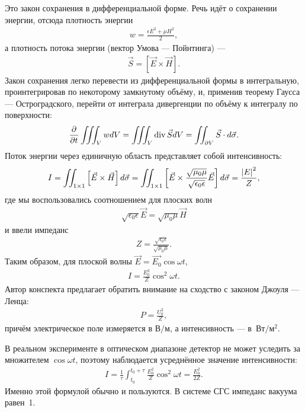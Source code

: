 Это закон сохранения в дифференциальной форме. Речь идёт о сохранении энергии,
отсюда плотность энергии
\begin{align*}
  w = 
  \frac{\epsilon E^2 + \mu H^2}{2},
\end{align*}
а плотность потока энергии (вектор Умова --- Пойнтинга) ---
\begin{align*}
  \vec{S} = \left[\vec{E} \times \vec{H}\right].
\end{align*}
Закон сохранения легко перевести из дифференциальной формы в интегральную,
проинтегрировав по некоторому замкнутому объёму, и, применив теорему Гаусса ---
Остроградского, перейти от интеграла дивергенции по объёму к интегралу по
поверхности:
\begin{align*}
  \frac{\partial^{} }{\partial t^{}}\iiint_{V} w dV = 
  \iiint_{V} \operatorname*{div}\vec{S} dV = 
  \iint_{\partial V} \vec{S} \cdot d\vec{\sigma}.
\end{align*}
Поток энергии через единичную область представляет собой интенсивность:
\begin{align*}
  I = 
  \iint_{1\times 1} \left[\vec{E} \times \vec{H}\right] d\vec{\sigma} = 
  \iint_{1\times 1} \left[\vec{E} \times
  \frac{\sqrt{\mu_0\mu}}{\sqrt{\epsilon_0\epsilon}}\vec{E}\right] d\vec{\sigma} = \frac{\left\lvert E \right\rvert^2}{Z},
\end{align*}
где мы воспользовались соотношением для плоских волн
\begin{align*}
  \sqrt{\epsilon_0\epsilon}\vec{E} = \sqrt{\mu_0\mu}\vec{H}
\end{align*}
и ввели импеданс
\begin{align*}
  Z = \frac{\sqrt{\epsilon_0\epsilon}}{\sqrt{\mu_0\mu}}.
\end{align*}
Таким образом, для плоской волны \(\vec{E} = \vec{E_0}\cos{\omega t}\),
\begin{align*}
  I = \frac{E_0^2}{Z} \cos^2\omega t.
\end{align*}
Автор конспекта предлагает обратить внимание на сходство с законом Джоуля ---
Ленца:
\begin{align*}
  P = \frac{U_0^2}{Z},
\end{align*}
причём электрическое поле измеряется в \(\text{В}/\text{м}\), а интенсивность ---
в~\(\text{Вт}/\text{м}^2\).

В реальном эксперименте в оптическом диапазоне детектор не может уследить за
множителем \(\cos\omega t\), поэтому наблюдается усреднённое значение
интенсивности:
\begin{align*}
  I = \frac{1}{\tau}\int_{t_0}^{t_0 + \tau}\frac{E_0^2}{Z} \cos^2\omega
  t = \frac{E_0^2}{2Z}.
\end{align*}
Именно этой формулой обычно и пользуются. В системе СГС импеданс вакуума равен~1.
  

